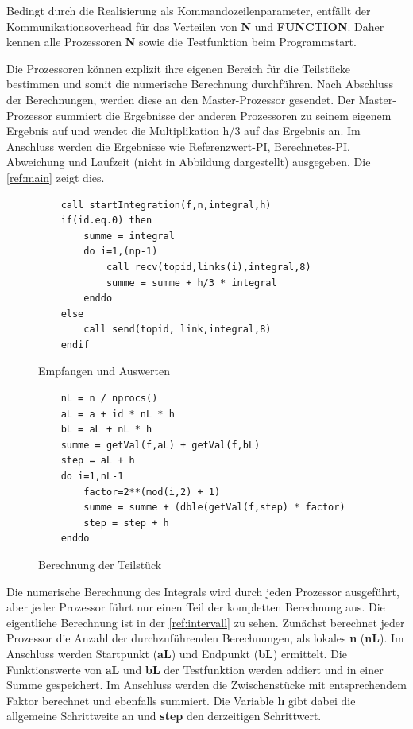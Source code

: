 Bedingt durch die Realisierung als Kommandozeilenparameter, entfällt der Kommunikationsoverhead für das Verteilen von \textbf{N} und \textbf{FUNCTION}.
Daher kennen alle Prozessoren \textbf{N} sowie die Testfunktion beim Programmstart.

Die Prozessoren können explizit ihre eigenen Bereich für die Teilstücke bestimmen und somit die numerische Berechnung durchführen.
Nach Abschluss der Berechnungen, werden diese an den Master-Prozessor gesendet.
Der Master-Prozessor summiert die Ergebnisse der anderen Prozessoren zu seinem eigenem Ergebnis auf und wendet die Multiplikation h/3 auf das Ergebnis an.
Im Anschluss werden die Ergebnisse wie Referenzwert-PI, Berechnetes-PI, Abweichung und Laufzeit (nicht in Abbildung dargestellt) ausgegeben. 
Die \autoref{ref:main} zeigt dies.
\begin{figure}[h]
\hrulefill

\begin{minipage}{0.49\textwidth}
\begin{lstlisting}
	call startIntegration(f,n,integral,h)
	if(id.eq.0) then
		summe = integral
		do i=1,(np-1)
			call recv(topid,links(i),integral,8)
			summe = summe + h/3 * integral
		enddo
	else
		call send(topid, link,integral,8)
	endif
\end{lstlisting}
	\caption{Empfangen und Auswerten}
	\label{ref:main}
\end{minipage}
\hfill
\vline
\begin{minipage}{0.49\textwidth}
\begin{lstlisting}
	nL = n / nprocs()
	aL = a + id * nL * h
	bL = aL + nL * h
	summe = getVal(f,aL) + getVal(f,bL)   
	step = aL + h
	do i=1,nL-1
		factor=2**(mod(i,2) + 1)
		summe = summe + (dble(getVal(f,step) * factor)
		step = step + h    
	enddo
\end{lstlisting}
	\caption{Berechnung der Teilstück}
	\label{ref:intervall}
\end{minipage}

\hrulefill
\end{figure}

Die numerische Berechnung des Integrals wird durch jeden Prozessor ausgeführt, aber jeder Prozessor führt nur einen Teil der kompletten Berechnung aus.
Die eigentliche Berechnung ist in der \autoref{ref:intervall} zu sehen.
Zunächst berechnet jeder Prozessor die Anzahl der durchzuführenden Berechnungen, als lokales \textbf{n} (\textbf{nL}).
Im Anschluss werden Startpunkt (\textbf{aL}) und Endpunkt (\textbf{bL}) ermittelt.
Die Funktionswerte von \textbf{aL} und \textbf{bL} der Testfunktion werden addiert und in einer Summe gespeichert.
Im Anschluss werden die Zwischenstücke mit entsprechendem Faktor berechnet und ebenfalls summiert.
Die Variable \textbf{h} gibt dabei die allgemeine Schrittweite an und \textbf{step} den derzeitigen Schrittwert.

